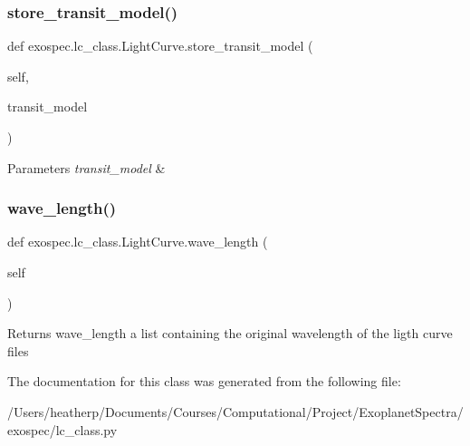 \subsubsection{\texorpdfstring{store\+\_\+transit\+\_\+model()}{store\_transit\_model()}}
{\footnotesize\ttfamily def exospec.\+lc\+\_\+class.\+Light\+Curve.\+store\+\_\+transit\+\_\+model (\begin{DoxyParamCaption}\item[{}]{self,  }\item[{}]{transit\+\_\+model }\end{DoxyParamCaption})}


\begin{DoxyParams}{Parameters}
{\em transit\+\_\+model} & \\
\hline
\end{DoxyParams}
\mbox{\label{classexospec_1_1lc__class_1_1_light_curve_a9da0e4bf8f9ea153afb534d63fb7d24a}} 
\subsubsection{\texorpdfstring{wave\+\_\+length()}{wave\_length()}}
{\footnotesize\ttfamily def exospec.\+lc\+\_\+class.\+Light\+Curve.\+wave\+\_\+length (\begin{DoxyParamCaption}\item[{}]{self }\end{DoxyParamCaption})}

\begin{DoxyReturn}{Returns}
wave\+\_\+length a list containing the original wavelength of the ligth curve files 
\end{DoxyReturn}


The documentation for this class was generated from the following file\+:\begin{DoxyCompactItemize}
\item 
/\+Users/heatherp/\+Documents/\+Courses/\+Computational/\+Project/\+Exoplanet\+Spectra/exospec/lc\+\_\+class.\+py\end{DoxyCompactItemize}
